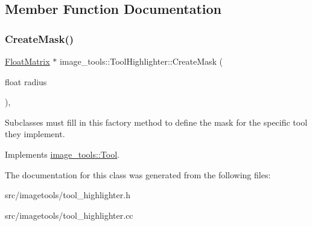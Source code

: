 \subsection{Member Function Documentation}
\mbox{\label{classimage__tools_1_1ToolHighlighter_a8c5c4f6c91fc49a89c1d24bdc2b3ea70}} 
\subsubsection{\texorpdfstring{Create\+Mask()}{CreateMask()}}
{\footnotesize\ttfamily \hyperlink{classimage__tools_1_1FloatMatrix}{Float\+Matrix} $\ast$ image\+\_\+tools\+::\+Tool\+Highlighter\+::\+Create\+Mask (\begin{DoxyParamCaption}\item[{float}]{radius }\end{DoxyParamCaption})\hspace{0.3cm}{\ttfamily [override]}, {\ttfamily [virtual]}}

Subclasses must fill in this factory method to define the mask for the specific tool they implement. 

Implements \hyperlink{classimage__tools_1_1Tool_a7d58325846dbc0467e52221daa1310a7}{image\+\_\+tools\+::\+Tool}.



The documentation for this class was generated from the following files\+:\begin{DoxyCompactItemize}
\item 
src/imagetools/tool\+\_\+highlighter.\+h\item 
src/imagetools/tool\+\_\+highlighter.\+cc\end{DoxyCompactItemize}
